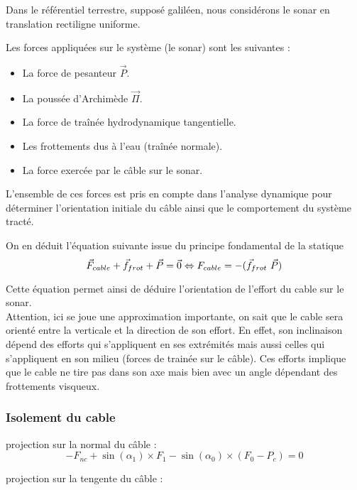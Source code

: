 \documentclass[12pt,a4paper]{report}
\begin{document}
Dans le référentiel terrestre, supposé galiléen, nous considérons le sonar en translation rectiligne uniforme.

Les forces appliquées sur le système (le sonar) sont les suivantes :
\begin{itemize}
  \item La force de pesanteur \( \vec{P} \).
  \item La poussée d’Archimède \( \vec{\Pi} \).
  \item La force de traînée hydrodynamique tangentielle.
  \item Les frottements dus à l’eau (traînée normale).
  \item La force exercée par le câble sur le sonar.
\end{itemize}

L’ensemble de ces forces est pris en compte dans l’analyse dynamique pour déterminer l’orientation initiale du câble 
ainsi que le comportement du système tracté.

On en déduit l'équation suivante issue du principe fondamental de la statique
\\
\[
    \vec{F}_{cable} + \vec{f}_{frot} + \vec{P} = \vec{0} \\
    \Leftrightarrow  {F}_{cable} = - (\vec{f}_{frot} \ \vec{P})
\]


Cette équation permet ainsi de déduire l'orientation de l'effort du cable sur le sonar. \\
Attention, ici se joue une approximation importante, on sait que le cable sera orienté entre la verticale et la
direction de son effort. En effet, son inclinaison dépend des efforts qui s'appliquent en ses extrémités mais aussi
celles qui s'appliquent en son milieu (forces de trainée sur le câble). Ces efforts implique que le cable ne tire pas
dans son axe mais bien avec un angle dépendant des frottements visqueux.

\subsubsection*{Isolement du cable}

projection sur la normal du câble :
\[
    -F_{nc} + \sin(\alpha_1) \times F_1 - \sin(\alpha_0) \times (F_0 - P_{c}) = 0
\]

projection sur la tengente du câble :
\end{document}
